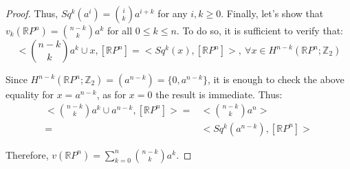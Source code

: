 \documentclass[12pt,oneside]{book}
\newcommand{\ds}{\displaystyle}
\newcommand{\RP}{\mathbb{R}P}
\newcommand{\Z}{\mathbb{Z}}
\begin{document}
\begin{proof}
    Thus, $Sq^{k}(a^{i})=\binom{i}{k}a^{i+k}$ for any $i,k\geq 0$. Finally, let's show that $v_{k}(\RP^{n})=\binom{n-k}{k}a^{k}$ for all 
    $0\leq k\leq n$. To do so, it is sufficient to verify that:
    $$ <\binom{n-k}{k}a^{k}\cup x,[\RP^{n}]=<Sq^{k}(x),[\RP^{n}]>, \ \forall x\in H^{n-k}(\RP^{n};\Z_{2}) $$
    
    Since $H^{n-k}(\RP^{n};\Z_{2})=(a^{n-k})=\{ 0,a^{n-k} \}$, it is enough to check the above equality for $x=a^{n-k}$, as for $x=0$ the 
    result is immediate. Thus:
    \[
    \begin{array}{rl}
        <\binom{n-k}{k}a^{k}\cup a^{n-k},[\RP^{n}]> = & <\binom{n-k}{k}a^{n}> \\
        = & <Sq^{k}(a^{n-k}),[\RP^{n}]>
    \end{array}
    \]
    
    Therefore, $v(\RP^{n})=\ds\sum_{k=0}^{n}\binom{n-k}{k}a^{k}$.
    
    \end{proof}
    
\end{document}
